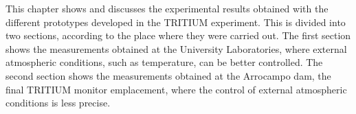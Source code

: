 This chapter shows and discusses the experimental results obtained with the different prototypes developed in the TRITIUM experiment. This is divided into two sections, according to the place where they were carried out. The first section shows the measurements obtained at the University Laboratories, where external atmospheric conditions, such as temperature, can be better controlled. The second section shows the measurements obtained at the Arrocampo dam, the final TRITIUM monitor emplacement, where the control of external atmospheric conditions is less precise.


